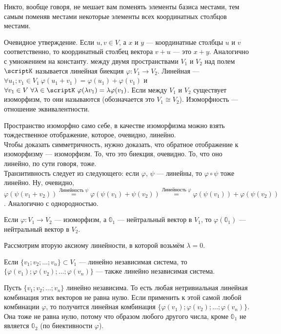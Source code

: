 \documentclass{article}
\begin{document}
\begin{itemize}
\begin{Comment}
            Никто, вообще говоря, не мешает вам поменять элементы базиса местами, тем самым поменяв местами некоторые элементы всех координатных столбцов местами.
        \end{Comment}
        \thm Очевидное утверждение. Если $u,v\in V$, а $x$ и $y$ --- координатные столбцы $u$ и $v$ соответственно, то координатный столбец вектора $v+u$ --- это $x+y$. Аналогично с умножением на константу.
        \dfn {} между двумя пространствами $V_1$ и $V_2$ над полем $\scriptK$ называется линейная биекция $\varphi\colon V_1\to V_2$. Линейная --- $\forall u_1;v_1\in V_1~\varphi(u_1+v_1)=\varphi(u_1)+\varphi(v_1)$ и $\forall v_1\in V~\forall\lambda\in\scriptK~\varphi(\lambda v_1)=\lambda\varphi(v_1)$.
        \dfn Если между $V_1$ и $V_2$ существует изоморфизм, то они называются  (обозначается это $V_1\cong V_2$).
        \thm Изоморфность --- отношение эквивалентности.
        \begin{Proof}
            Пространство изоморфно само себе, в качестве изоморфизма можно взять тождественное отображение, которое, очевидно, линейно.\\
            Чтобы доказать симметричность, нужно доказать, что обратное отображение к изоморфизму --- изоморфизм. То, что это биекция, очевидно. То, что оно линейно, по сути говоря, тоже.\\
            Транзитивность следует из следующего: если $\varphi$, $\psi$ --- линейны, то $\varphi\circ\psi$ тоже линейно. Ну, очевидно, $\varphi(\psi(v_1+v_2))\overset{\text{Линейность }\psi}=\varphi(\psi(v_1)+\psi(v_2))\overset{\text{Линейность }\varphi}=\varphi(\psi(v_1))+\varphi(\psi(v_2))$. Аналогично с однородностью.
        \end{Proof}
        \thm Если $\varphi\colon V_1\to V_2$ --- изоморфизм, а $\mathbb0_1$ --- нейтральный вектор в $V_1$, то $\varphi(\mathbb0_1)$ --- нейтральный вектор в $V_2$.
        \begin{Proof}
            Рассмотрим вторую аксиому линейности, в которой возьмём $\lambda=0$.
        \end{Proof}
        \thm Если $\{v_1;v_2;\ldots;v_n\}\subset V_1$ --- линейно независимая система, то $\{\varphi(v_1);\varphi(v_2);\ldots;\varphi(v_n)\}$ --- также линейно независимая система.
        \begin{Proof}
            Пусть $\{v_1;v_2;\ldots;v_n\}$ линейно независима. То есть любая нетривиальная линейная комбинация этих векторов не равна нулю. Если применить к этой самой любой комбинации $\varphi$, то получится линейная комбинация $\{\varphi(v_1);\varphi(v_2);\ldots;\varphi(v_n)\}$. Она тоже не равна нулю, потому что образом любого другого числа, кроме $\mathbb0_1$ не является $\mathbb0_2$ (по биективности $\varphi$).

\end{Proof}
\end{itemize}
\end{document}
